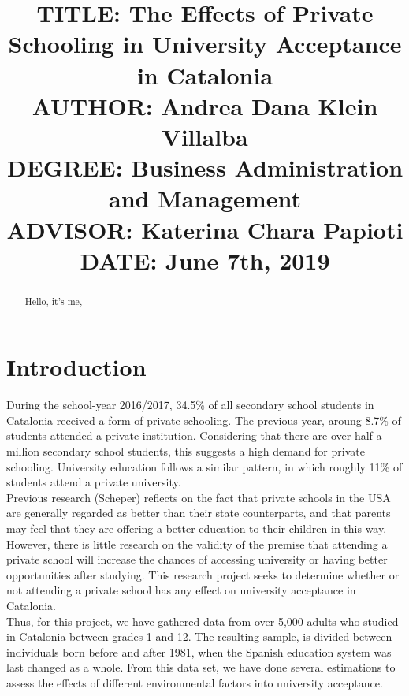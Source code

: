 \documentclass[12pt]{article}
\begin{document}

\title{{\large TITLE: The Effects of Private Schooling in University Acceptance in Catalonia\\
AUTHOR: Andrea Dana Klein Villalba\\
DEGREE: Business Administration and Management\\
ADVISOR: Katerina Chara Papioti\\
DATE: June 7th, 2019\\}}
\date{}

\clearpage\maketitle
\thispagestyle{empty}
\newpage

\begin{abstract}
Hello, it's me,
\end{abstract}
\newpage

 \tableofcontents
 \newpage

\section{Introduction}

During the school-year 2016/2017, 34.5\% of all secondary school students in Catalonia received a form of private schooling. The previous year, aroung 8.7\% of students attended a private institution. Considering that there are over half a million secondary school students, this suggests a high demand for private schooling. University education follows a similar pattern, in which roughly 11\% of students attend a private university.\\
Previous research (Scheper) reflects on the fact that private schools in the USA are generally regarded as better than their state counterparts, and that parents may feel that they are offering a better education to their children in this way. However, there is little research on the validity of the premise that attending a private school will increase the chances of accessing university or having better opportunities after studying. This research project seeks to determine whether or not attending a private school has any effect on university acceptance in Catalonia. \\
Thus, for this project, we have gathered data from over 5,000 adults who studied in Catalonia between grades 1 and 12. The resulting sample, is divided between individuals born before and after 1981, when the Spanish education system was last changed as a whole. From this data set, we have done several estimations to assess the effects of different environmental factors into university acceptance. 
\end{document}
